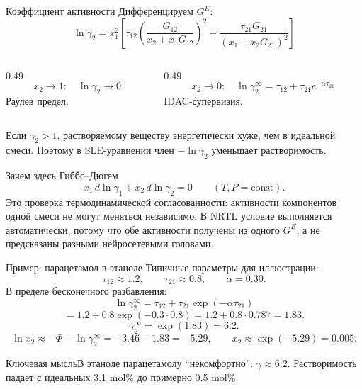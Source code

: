 \documentclass[aspectratio=169,10pt]{beamer}
\newcommand{\smallnote}[1]{{\scriptsize\color{TGSlate}#1}}
\newcommand{\keybox}[1]{\begin{block}{Ключевая мысль}#1\end{block}}
\begin{document}
\begin{frame}{Коэффициент активности}
  \small
  Дифференцируем $G^E$:
  \[
    \boxed{
    \ln\gamma_2=x_1^2\left[
      \tau_{12}\left(\frac{G_{12}}{x_2+x_1G_{12}}\right)^2
      +
      \frac{\tau_{21}G_{21}}{(x_1+x_2G_{21})^2}
    \right]}
  \]
  \pause
  \begin{columns}[T,onlytextwidth]
    \begin{column}{0.49\textwidth}
      \[
        x_2\to1:\quad \ln\gamma_2\to0
      \]
      \smallnote{Раулев предел.}
    \end{column}
    \begin{column}{0.49\textwidth}
      \[
        x_2\to0:\quad
        \ln\gamma_2^\infty=
        \tau_{12}+\tau_{21}e^{-\alpha\tau_{21}}
      \]
      \smallnote{IDAC-супервизия.}
    \end{column}
  \end{columns}
  \pause
  \begin{center}
    \small\color{TGSlate}
    Если $\gamma_2>1$, растворяемому веществу энергетически хуже, чем в идеальной смеси. Поэтому в SLE-уравнении член $-\ln\gamma_2$ уменьшает растворимость.
  \end{center}
  \pause
  \begin{block}{Зачем здесь Гиббс–Дюгем}
    \[
      x_1\,d\ln\gamma_1+x_2\,d\ln\gamma_2=0
      \qquad (T,P=\mathrm{const}).
    \]
    \smallnote{Это проверка термодинамической согласованности: активности компонентов одной смеси не могут меняться независимо. В NRTL условие выполняется автоматически, потому что обе активности получены из одного $G^E$, а не предсказаны разными нейросетевыми головами.}
  \end{block}
\end{frame}

\begin{frame}{Пример: парацетамол в этаноле}
  \small
  Типичные параметры для иллюстрации:
  \[
    \tau_{12}\approx1.2,\qquad
    \tau_{21}\approx0.8,\qquad
    \alpha=0.30.
  \]
  \pause
  В пределе бесконечного разбавления:
  \[
    \ln\gamma_2^\infty
    =
    \tau_{12}+\tau_{21}\exp(-\alpha\tau_{21})
  \]
  \pause
  \[
    =
    1.2+0.8\exp(-0.3\cdot0.8)
    =
    1.2+0.8\cdot0.787
    =
    1.83.
  \]
  \pause
  \[
    \gamma_2^\infty=\exp(1.83)=6.2.
  \]
  \pause
  \[
    \ln x_2\approx-\Phi-\ln\gamma_2^\infty
    =
    -3.46-1.83
    =
    -5.29,
    \qquad
    x_2\approx\exp(-5.29)=0.005.
  \]
  \pause
  \keybox{В этаноле парацетамолу ``некомфортно'': $\gamma\approx6.2$. Растворимость падает с идеальных 3.1 mol\% до примерно 0.5 mol\%.}
\end{frame}
\end{document}
